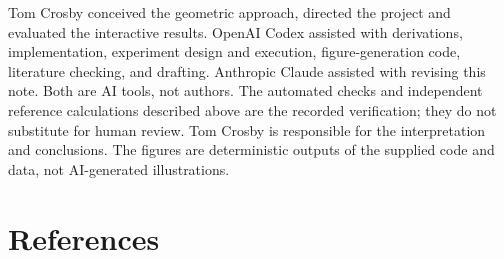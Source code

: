 \documentclass[11pt,a4paper]{article}
\begin{document}
Tom Crosby conceived the geometric approach, directed the project and
evaluated the interactive results. OpenAI Codex assisted with
derivations, implementation, experiment design and execution,
figure-generation code, literature checking, and drafting. Anthropic
Claude assisted with revising this note. Both are AI tools, not authors.
The automated checks and independent reference calculations described
above are the recorded verification; they do not substitute for human
review. Tom Crosby is responsible for the interpretation and
conclusions. The figures are deterministic outputs of the supplied code
and data, not AI-generated illustrations.

\section*{References}\label{references}
\end{document}
